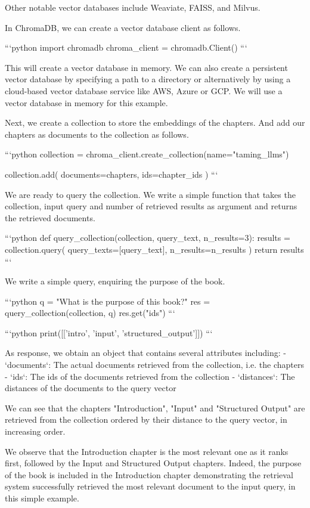 {{Other notable vector databases include Weaviate, FAISS, and Milvus.

In ChromaDB, we can create a vector database client as follows.


```python
import chromadb
chroma_client = chromadb.Client()
```

This will create a vector database in memory. We can also create a persistent vector database by specifying a path to a directory or alternatively by using a cloud-based vector database service like AWS, Azure or GCP. We will use a vector database in memory for this example.

Next, we create a collection to store the embeddings of the chapters. And add our chapters as documents to the collection as follows.


```python
collection = chroma_client.create_collection(name="taming_llms")

collection.add(
    documents=chapters,
    ids=chapter_ids
)
```

We are ready to query the collection. We write a simple function that takes the collection, input query and number of retrieved results as argument and returns the retrieved documents.


```python
def query_collection(collection, query_text, n_results=3):
    results = collection.query(
        query_texts=[query_text],
        n_results=n_results
    )
    return results
```

We write a simple query, enquiring the purpose of the book.


```python
q = "What is the purpose of this book?"
res = query_collection(collection, q)
res.get("ids")
```


```python
print([['intro', 'input', 'structured_output']])
```

As response, we obtain an object that contains several attributes including:
- `documents`: The actual documents retrieved from the collection, i.e. the chapters 
- `ids`: The ids of the documents retrieved from the collection
- `distances`: The distances of the documents to the query vector

We can see that the chapters "Introduction", "Input" and "Structured Output" are retrieved from the collection ordered by their distance to the query vector, in increasing order.

We observe that the Introduction chapter is the most relevant one as it ranks first, followed by the Input and Structured Output chapters. Indeed, the purpose of the book is included in the Introduction chapter demonstrating the retrieval system successfully retrieved the most relevant document to the input query, in this simple example.

}}
